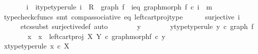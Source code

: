 \begin{isabellebody}
\ \ \ \ \isamarkupfalse%
\ \isamarkupfalse%
\ i\ \ i{\isacharunderscore}{\kern0pt}type{\isacharbrackleft}{\kern0pt}type{\isacharunderscore}{\kern0pt}rule{\isacharbrackright}{\kern0pt}{\isacharcolon}{\kern0pt}\ {\isachardoublequoteopen}i\ {\isacharcolon}{\kern0pt}\ R\ {\isasymrightarrow}\ graph\ f{\isachardoublequoteclose}\ \ i{\isacharunderscore}{\kern0pt}eq{\isacharcolon}{\kern0pt}\ {\isachardoublequoteopen}graph{\isacharunderscore}{\kern0pt}morph\ f\ {\isasymcirc}\isactrlsub c\ i\ {\isacharequal}{\kern0pt}\ m{\isachardoublequoteclose}\isanewline
\ \ \ \ \ \ \isamarkupfalse%
\ {\isacharparenleft}{\kern0pt}typecheck{\isacharunderscore}{\kern0pt}cfuncs{\isacharcomma}{\kern0pt}\ smt\ comp{\isacharunderscore}{\kern0pt}associative{}\ eq\ left{\isacharunderscore}{\kern0pt}cart{\isacharunderscore}{\kern0pt}proj{\isacharunderscore}{\kern0pt}type{\isacharparenright}{\kern0pt}\isanewline
\ \ \ \ \isamarkupfalse%
\ {\isachardoublequoteopen}surjective\ i{\isachardoublequoteclose}\isanewline
\ \ \ \ \isamarkupfalse%
\ {\isacharparenleft}{\kern0pt}etcs{\isacharunderscore}{\kern0pt}subst\ surjective{\isacharunderscore}{\kern0pt}def{}{\isacharcomma}{\kern0pt}\ auto{\isacharparenright}{\kern0pt}\isanewline
\ \ \ \ \ \ \isamarkupfalse%
\ y{\isacharprime}{\kern0pt}\isanewline
\ \ \ \ \ \ \isamarkupfalse%
\ y{\isacharprime}{\kern0pt}{\isacharunderscore}{\kern0pt}type{\isacharbrackleft}{\kern0pt}type{\isacharunderscore}{\kern0pt}rule{\isacharbrackright}{\kern0pt}{\isacharcolon}{\kern0pt}\ {\isachardoublequoteopen}y{\isacharprime}{\kern0pt}\ {\isasymin}\isactrlsub c\ graph\ f{\isachardoublequoteclose}\isanewline
\isanewline
\ \ \ \ \ \ \isamarkupfalse%
\ x\ \ {\isachardoublequoteopen}x\ {\isacharequal}{\kern0pt}\ left{\isacharunderscore}{\kern0pt}cart{\isacharunderscore}{\kern0pt}proj\ X\ Y\ {\isasymcirc}\isactrlsub c\ graph{\isacharunderscore}{\kern0pt}morph{\isacharparenleft}{\kern0pt}f{\isacharparenright}{\kern0pt}\ {\isasymcirc}\isactrlsub c\ y{\isacharprime}{\kern0pt}{\isachardoublequoteclose}\isanewline
\ \ \ \ \ \ \isamarkupfalse%
\ \isamarkupfalse%
\ x{\isacharunderscore}{\kern0pt}type{\isacharbrackleft}{\kern0pt}type{\isacharunderscore}{\kern0pt}rule{\isacharbrackright}{\kern0pt}{\isacharcolon}{\kern0pt}\ {\isachardoublequoteopen}x\ {\isasymin}\isactrlsub c\ X{\isachardoublequoteclose}\isanewline
\ \ \ \ \ \ \ \ \isamarkupfalse%

\end{isabellebody}
